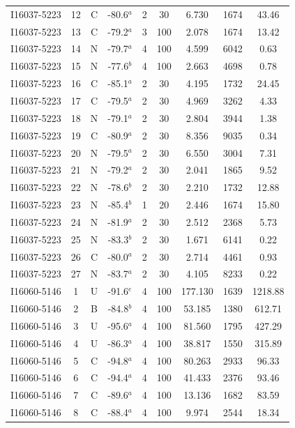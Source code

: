 \begin{table}
\begin{tabular}{ccccccccc}
I16037-5223 & 12 & C & -80.6$^{a}$ & 2 & 30 & 6.730 & 1674 & 43.46 \\
I16037-5223 & 13 & C & -79.2$^{a}$ & 3 & 100 & 2.078 & 1674 & 13.42 \\
I16037-5223 & 14 & N & -79.7$^{a}$ & 4 & 100 & 4.599 & 6042 & 0.63 \\
I16037-5223 & 15 & N & -77.6$^{b}$ & 4 & 100 & 2.663 & 4698 & 0.78 \\
I16037-5223 & 16 & C & -85.1$^{a}$ & 2 & 30 & 4.195 & 1732 & 24.45 \\
I16037-5223 & 17 & C & -79.5$^{a}$ & 2 & 30 & 4.969 & 3262 & 4.33 \\
I16037-5223 & 18 & N & -79.1$^{a}$ & 2 & 30 & 2.804 & 3944 & 1.38 \\
I16037-5223 & 19 & C & -80.9$^{a}$ & 2 & 30 & 8.356 & 9035 & 0.34 \\
I16037-5223 & 20 & N & -79.5$^{a}$ & 2 & 30 & 6.550 & 3004 & 7.31 \\
I16037-5223 & 21 & N & -79.2$^{a}$ & 2 & 30 & 2.041 & 1865 & 9.52 \\
I16037-5223 & 22 & N & -78.6$^{b}$ & 2 & 30 & 2.210 & 1732 & 12.88 \\
I16037-5223 & 23 & N & -85.4$^{b}$ & 1 & 20 & 2.446 & 1674 & 15.80 \\
I16037-5223 & 24 & N & -81.9$^{a}$ & 2 & 30 & 2.512 & 2368 & 5.73 \\
I16037-5223 & 25 & N & -83.3$^{b}$ & 2 & 30 & 1.671 & 6141 & 0.22 \\
I16037-5223 & 26 & C & -80.0$^{a}$ & 2 & 30 & 2.714 & 4461 & 0.93 \\
I16037-5223 & 27 & N & -83.7$^{a}$ & 2 & 30 & 4.105 & 8233 & 0.22 \\
I16060-5146 & 1 & U & -91.6$^{e}$ & 4 & 100 & 177.130 & 1639 & 1218.88 \\
I16060-5146 & 2 & B & -84.8$^{b}$ & 4 & 100 & 53.185 & 1380 & 612.71 \\
I16060-5146 & 3 & U & -95.6$^{a}$ & 4 & 100 & 81.560 & 1795 & 427.29 \\
I16060-5146 & 4 & U & -86.3$^{a}$ & 4 & 100 & 38.817 & 1550 & 315.89 \\
I16060-5146 & 5 & C & -94.8$^{a}$ & 4 & 100 & 80.263 & 2933 & 96.33 \\
I16060-5146 & 6 & C & -94.4$^{a}$ & 4 & 100 & 41.433 & 2376 & 93.46 \\
I16060-5146 & 7 & C & -89.6$^{a}$ & 4 & 100 & 13.136 & 1682 & 83.59 \\
I16060-5146 & 8 & C & -88.4$^{a}$ & 4 & 100 & 9.974 & 2544 & 18.34 \\

\end{tabular}
\end{table}
